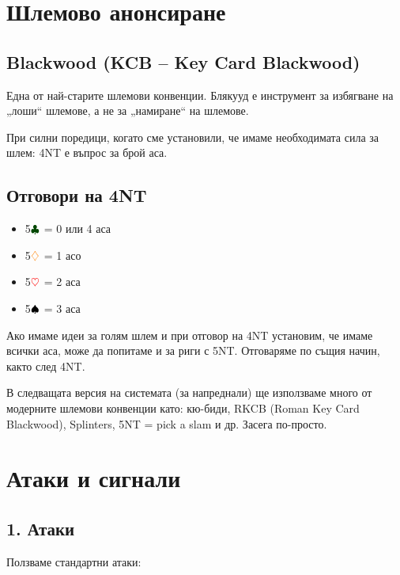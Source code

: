 \documentclass[10pt,a5paper]{extarticle}
\newcommand{\Rheart}{\textcolor{red}{\heartsuit}}
\newcommand{\Rdiamond}{\textcolor{orange}{\diamondsuit}}
\newcommand{\Bspade}{\textcolor{black}{\spadesuit}}
\newcommand{\Bclub}{\textcolor{darkgreen}{\clubsuit}}
\begin{document}
\section*{Шлемово анонсиране}

\subsection*{Blackwood (KCB -- Key Card Blackwood)}  
Една от най-старите шлемови конвенции. Блякууд е инструмент за избягване на „лоши“ шлемове, а не за „намиране“ на шлемове.  

При силни поредици, когато сме установили, че имаме необходимата сила за шлем:  
4NT е въпрос за брой аса.  

\subsection*{Отговори на 4NT}
\begin{itemize}
    \item[] 5$\Bclub$ = 0 или 4 аса  
    \item[] 5$\Rdiamond$ = 1 асо  
    \item[] 5$\Rheart$ = 2 аса  
    \item[] 5$\Bspade$ = 3 аса  
\end{itemize}

Ако имаме идеи за голям шлем и при отговор на 4NT установим, че имаме всички аса, може да попитаме и за риги с 5NT. Отговаряме по същия начин, както след 4NT.  

В следващата версия на системата (за напреднали) ще използваме много от модерните шлемови конвенции като: кю-биди, RKCB (Roman Key Card Blackwood), Splinters, 5NT = pick a slam и др.  
Засега по-просто.


\section*{Атаки и сигнали}

\subsection*{1. Атаки}
Ползваме стандартни атаки:  
\end{document}

